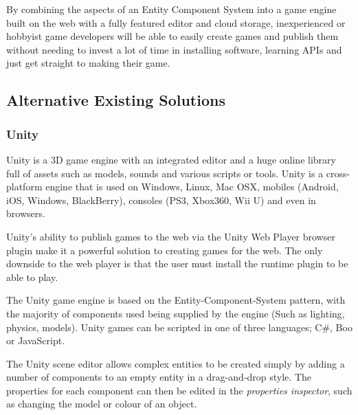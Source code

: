 \documentclass[a4paper, 12pt]{article}
\begin{document}



By combining the aspects of an Entity Component System into a game engine built on the web with a fully featured editor and cloud storage, inexperienced or hobbyist game developers will be able to easily create games and publish them without needing to invest a lot of time in installing software, learning APIs and just get straight to making their game.

\subsection{Alternative Existing Solutions}
\subsubsection{Unity}
Unity is a 3D game engine with an integrated editor and a huge online library full of assets such as models, sounds and various scripts or tools. Unity is a cross-platform engine that is used on Windows, Linux, Mac OSX, mobiles (Android, iOS, Windows, BlackBerry), consoles (PS3, Xbox360, Wii U) and even in browsers.


Unity's ability to publish games to the web via the Unity Web Player browser plugin make it a powerful solution to creating games for the web. The only downside to the web player is that the user must install the runtime plugin to be able to play.


The Unity game engine is based on the Entity-Component-System pattern, with the majority of components used being supplied by the engine (Such as lighting, physics, models). Unity games can be scripted in one of three languages; C\#, Boo or JavaScript.


The Unity scene editor allows complex entities to be created simply by adding a number of components to an empty entity in a drag-and-drop style. The properties for each component can then be edited in the \emph{properties inspector}, such as changing the model or colour of an object. 
\end{document}
